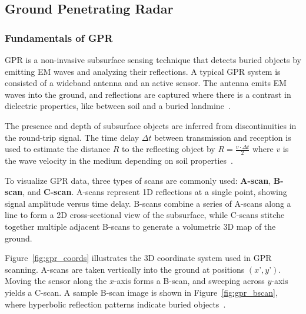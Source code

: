\subsection{Ground Penetrating Radar}\label{GPR_system}

\subsubsection{Fundamentals of GPR}\label{GPR_fundamental}

\gls{GPR} is a non-invasive subsurface sensing technique that detects buried objects by emitting \gls{EM} waves and analyzing their reflections. A typical \gls{GPR} system is consisted of a wideband antenna and an active sensor. The antenna emits \gls{EM} waves into the ground, and reflections are captured where there is a contrast in dielectric properties, like between soil and a buried landmine~\cite{paik2002image}.

The presence and depth of subsurface objects are inferred from discontinuities in the round-trip signal. The time delay $\Delta t$ between transmission and reception is used to estimate the distance $R$ to the reflecting object by \( R = \frac{v \cdot \Delta t}{2}\) where $v$ is the wave velocity in the medium depending on soil properties~\cite{paik2002image}.

To visualize \gls{GPR} data, three types of scans are commonly used: \textbf{A-scan}, \textbf{B-scan}, and \textbf{C-scan}. A-scans represent 1D reflections at a single point, showing signal amplitude versus time delay. B-scans combine a series of A-scans along a line to form a 2D cross-sectional view of the subsurface, while C-scans stitche together multiple adjacent B-scans to generate a volumetric 3D map of the ground. 

Figure~\ref{fig:gpr_coords} illustrates the 3D coordinate system used in \gls{GPR} scanning. A-scans are taken vertically into the ground at positions $(x’, y’)$. Moving the sensor along the $x$-axis forms a B-scan, and sweeping across $y$-axis yields a C-scan. A sample B-scan image is shown in Figure~\ref{fig:gpr_bscan}, where hyperbolic reflection patterns indicate buried objects~\cite{paik2002image}.

